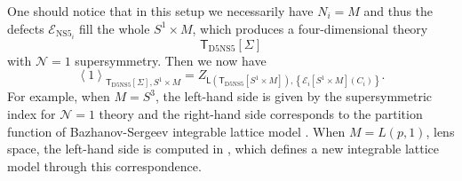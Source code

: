One should notice that in this setup we necessarily have $N_{i}=M$
and thus the defects $\mathcal{E}_{\mathrm{NS}5_{i}}$ fill the whole
$S^{1}\times M$, which produces a four-dimensional theory
\[
\mathsf{T}_{\mathrm{D5NS5}}\left[\Sigma\right]
\]
with $\mathcal{N}=1$ supersymmetry. Then we now have
\begin{equation}
  \left\langle  1  \right\rangle_{\mathsf{T}_{\mathrm{D5NS5}}\left[\Sigma\right], S^{1}\times M}
    =Z_{\mathsf{L}\left(\mathsf{T}_{\mathrm{D5NS5}}\left[S^{1}\times M\right]\right),\left\{ \mathcal{E}_{i}\left[S^{1}\times M\right]\left(C_{i}\right)\right\} }.
\end{equation}
For example, when $M=S^{3}$, the left-hand side is given by the supersymmetric
index for $\mathcal{N}=1$ theory and the right-hand side corresponds
to the partition function of Bazhanov-Sergeev integrable lattice model
\cite{Bazhanov:2010kz,Bazhanov:2011mz,Spiridonov:2010em,Yamazaki:2012cp}. When $M=L\left(p,1\right)$,
lens space, the left-hand side is computed in \cite{Yamazaki:2013nra}, which
defines a new integrable lattice model through this correspondence.

